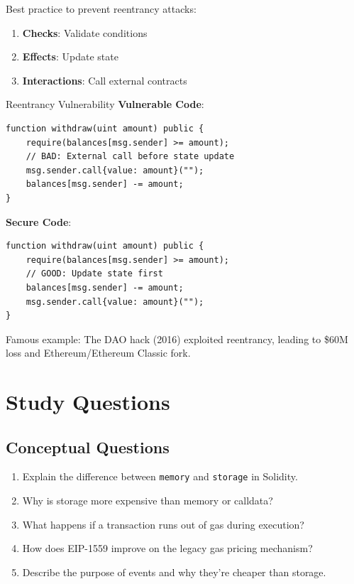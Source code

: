 \documentclass[11pt,a4paper]{article}
\begin{document}
Best practice to prevent reentrancy attacks:

\begin{enumerate}
  \item \textbf{Checks}: Validate conditions
  \item \textbf{Effects}: Update state
  \item \textbf{Interactions}: Call external contracts
\end{enumerate}

\begin{warningbox}{Reentrancy Vulnerability}
\textbf{Vulnerable Code}:
\begin{lstlisting}[language=Solidity]
function withdraw(uint amount) public {
    require(balances[msg.sender] >= amount);
    // BAD: External call before state update
    msg.sender.call{value: amount}("");
    balances[msg.sender] -= amount;
}
\end{lstlisting}

\textbf{Secure Code}:
\begin{lstlisting}[language=Solidity]
function withdraw(uint amount) public {
    require(balances[msg.sender] >= amount);
    // GOOD: Update state first
    balances[msg.sender] -= amount;
    msg.sender.call{value: amount}("");
}
\end{lstlisting}

Famous example: The DAO hack (2016) exploited reentrancy, leading to \$60M loss and Ethereum/Ethereum Classic fork.
\end{warningbox}

\section{Study Questions}

\subsection{Conceptual Questions}

\begin{enumerate}
  \item Explain the difference between \texttt{memory} and \texttt{storage} in Solidity.
  \item Why is storage more expensive than memory or calldata?
  \item What happens if a transaction runs out of gas during execution?
  \item How does EIP-1559 improve on the legacy gas pricing mechanism?
  \item Describe the purpose of events and why they're cheaper than storage.
\end{enumerate}
\end{document}
